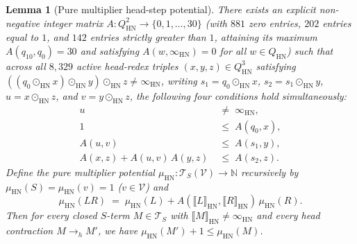 \documentclass[11pt,reqno]{amsart}
\numberwithin{equation}{section}
\theoremstyle{plain}
\newtheorem{lemma}[theorem]{Lemma}
\theoremstyle{definition}
\theoremstyle{remark}
\newcommand{\TS}{\mathcal{T}_S}
\newcommand{\TSV}{\mathcal{T}_S(\mathcal{V})}
\newcommand{\HN}{\mathrm{HN}}
\newcommand{\sem}[1]{\llbracket #1 \rrbracket}
\begin{document}
\begin{lemma}[Pure multiplier head-step potential]\label{lem:hn-potential}
There exists an explicit non-negative integer matrix $A \colon Q_{\HN}^2 \to \{0, 1, \dots, 30\}$ (with $881$ zero entries, $202$ entries equal to $1$, and $142$ entries strictly greater than $1$, attaining its maximum $A(q_{10}, q_0) = 30$ and satisfying $A(w, \infty_{\HN}) = 0$ for all $w \in Q_{\HN}$) such that across all $8{,}329$ active head-redex triples $(x, y, z) \in Q_{\HN}^3$ satisfying $((q_0 \odot_{\HN} x) \odot_{\HN} y) \odot_{\HN} z \neq \infty_{\HN}$, writing $s_1 = q_0 \odot_{\HN} x$, $s_2 = s_1 \odot_{\HN} y$, $u = x \odot_{\HN} z$, and $v = y \odot_{\HN} z$, the following four conditions hold simultaneously:
\begin{align}
u &\;\neq\; \infty_{\HN}, \label{eq:pot-1}\\
1 &\;\le\; A(q_0, x), \label{eq:pot-2}\\
A(u, v) &\;\le\; A(s_1, y), \label{eq:pot-3}\\
A(x, z) + A(u, v)\,A(y, z) &\;\le\; A(s_2, z). \label{eq:pot-4}
\end{align}
Define the pure multiplier potential $\mu_{\HN} \colon \TSV \to \mathbb{N}$ recursively by $\mu_{\HN}(S) = \mu_{\HN}(v) = 1$ ($v \in \mathcal{V}$) and
\begin{equation}\label{eq:mu-hn-def}
\mu_{\HN}(L R) \;=\; \mu_{\HN}(L) + A(\sem{L}_{\HN}, \sem{R}_{\HN})\,\mu_{\HN}(R).
\end{equation}
Then for every closed $S$-term $M \in \TS$ with $\sem{M}_{\HN} \neq \infty_{\HN}$ and every head contraction $M \to_h M'$, we have $\mu_{\HN}(M') + 1 \le \mu_{\HN}(M)$.
\end{lemma}
\end{document}
